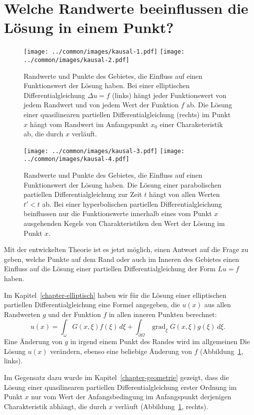 %
%
%
\section{Welche Randwerte beeinflussen die Lösung in einem Punkt?}
\begin{figure}
\centering
\texttt{[image: ../common/images/kausal-1.pdf]}\qquad\qquad%
\texttt{[image: ../common/images/kausal-2.pdf]}
\caption{Randwerte und Punkte des Gebietes, die Einfluss auf einen
Funktionswert der Lösung haben.
Bei einer elliptischen Differentialgleichung $\Delta u=f$
(links)
hängt jeder Funktionswert von jedem Randwert und von jedem Wert der
Funktion $f$ ab.
Die Lösung einer quasilinearen partiellen Differentialgleichung  (rechts)
im Punkt $x$ hängt vom Randwert im Anfangspunkt $x_0$ einer Charaketeristik
ab, die durch $x$ verläuft.
\label{einflussmenge1}}
\end{figure}
\begin{figure}
\centering
\texttt{[image: ../common/images/kausal-3.pdf]}\qquad\qquad%
\texttt{[image: ../common/images/kausal-4.pdf]}
\caption{Randwerte und Punkte des Gebietes, die Einfluss auf einen
Funktionswert der Lösung haben.
Die Lösung einer parabolischen partiellen Differentialgleichung
zur Zeit $t$ hängt von allen Werten $t'<t$ ab.
Bei einer hyperbolischen partiellen Differentialgleichung beinflussen 
nur die Funktionswerte innerhalb eines vom Punkt $x$ ausgehenden Kegels
von Charakteristiken den Wert der Lösung im Punkt $x$.
\label{einflussmenge2}}
\end{figure}
Mit der entwickelten Theorie ist es jetzt möglich, einen Antwort auf die
Frage zu geben, welche Punkte auf dem Rand oder auch im Inneren des Gebietes
einen Einfluss auf die Lösung einer partiellen Differentialgleichung
der Form $Lu=f$ haben.

Im Kapitel~\ref{chapter-elliptisch} haben wir für die Lösung einer
elliptischen partiellen Differentialgleichung eine Formel angegeben,
die $u(x)$ aus allen Randwerten $g$ und der Funktion $f$ in allen 
inneren Punkten berechnet:
\[
u(x)
=
\int_\omega G(x,\xi)f(\xi)\,d\xi
+
\int_{\partial\Omega} \operatorname{grad}_\xi G(x,\xi)g(\xi)\,d\xi.
\]
Eine Änderung von $g$ in irgend einem Punkt des Randes wird im allgemeinen
Die Lösung $u(x)$ verändern, ebenso eine beliebige Änderung von $f$
(Abbildung~\ref{einflussmenge1}, links).

Im Gegensatz dazu wurde im Kapitel~\ref{chapter-geometrie} gezeigt, 
dass die Lösung einer quasilinearen partiellen Differentialgleichung
erster Ordnung im Punkt $x$ nur vom Wert der Anfangsbedingung im Anfangspunkt
derjenigen Charakteristik abhängt, die durch $x$ verläuft
(Abbildung~\ref{einflussmenge1}, rechts).

